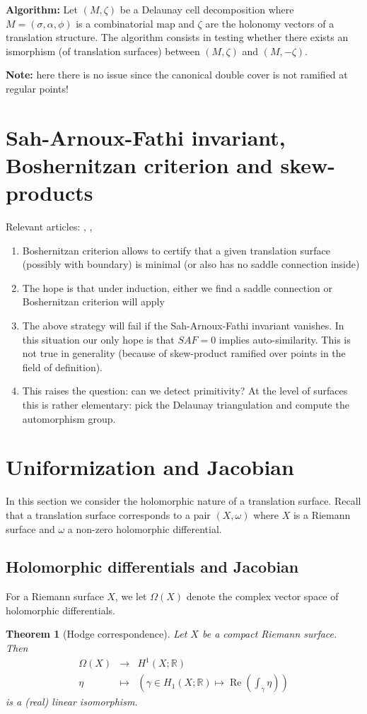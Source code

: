 \documentclass[a4paper,12pt]{article}
\def\bR{\mathbb{R}}
\def\Re{\operatorname{Re}}
\newtheorem{theorem}[definition]{Theorem}
\begin{document}
\textbf{Algorithm:} Let $(M, \zeta)$ be a Delaunay cell decomposition where $M
= (\sigma, \alpha, \phi)$ is a combinatorial map and $\zeta$ are the holonomy
vectors of a translation structure.  The algorithm consists in testing whether
there exists an ismorphism (of translation surfaces) between $(M, \zeta)$ and
$(M, -\zeta)$.

\textbf{Note:} here there is no issue since the canonical double cover is not
ramified at regular points!

\section{Sah-Arnoux-Fathi invariant, Boshernitzan criterion and skew-products}
Relevant articles: \cite{DoSchmidt}, \cite{DynnikovSkripchenko}, \cite{Boshernitzan}

\begin{enumerate}
\item Boshernitzan criterion allows to certify that a given translation surface (possibly with boundary)
is minimal (or also has no saddle connection inside)
\item The hope is that under induction, either we find a saddle connection or Boshernitzan criterion will apply
\item The above strategy will fail if the Sah-Arnoux-Fathi invariant vanishes. In this situation our only
hope is that $SAF=0$ implies auto-similarity. This is not true in generality (because of skew-product ramified
over points in the field of definition).
\item This raises the question: can we detect primitivity? At the level of
surfaces this is rather elementary: pick the Delaunay triangulation and compute
the automorphism group.
\end{enumerate}

\section{Uniformization and Jacobian}
In this section we consider the holomorphic nature of a translation surface. Recall that a translation
surface corresponds to a pair $(X, \omega)$ where $X$ is a Riemann surface and $\omega$ a non-zero
holomorphic differential.

\subsection{Holomorphic differentials and Jacobian}
For a Riemann surface $X$, we let $\Omega(X)$ denote the complex vector space
of holomorphic differentials.
\begin{theorem}[Hodge correspondence]
\label{thm:HodgeCorrespondence}
Let $X$ be a compact Riemann surface. Then
\[
\begin{array}{lll}
\Omega(X) & \to & H^1(X; \bR) \\
\eta & \mapsto & \left( \gamma \in H_1(X; \bR) \mapsto \Re(\int_\gamma \eta) \right)
\end{array}
\]
is a (real) linear isomorphism.
\end{theorem}
\end{document}
